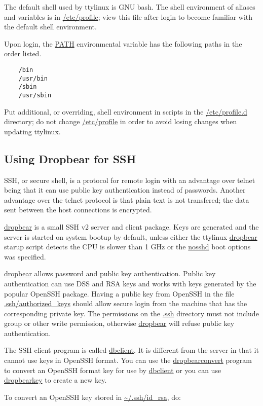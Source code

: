 \documentclass[10pt]{article}
\begin{document}
The default shell used by ttylinux is GNU bash. The shell environment of
aliases and variables is in \url{/etc/profile}; view this file after login to
become familiar with the default shell environment.

Upon login, the \url{PATH} environmental variable has the following paths in
the order listed.

\begin{lstlisting}
	/bin
	/usr/bin
	/sbin
	/usr/sbin
\end{lstlisting}

Put additional, or overriding, shell environment in scripts in the
\url{/etc/profile.d} directory; do not change \url{/etc/profile} in order to
avoid losing changes when updating ttylinux.

\subsection{Using Dropbear for SSH}

SSH, or secure shell, is a protocol for remote login with an advantage over
telnet being that it can use public key authentication instead of passwords.
Another advantage over the telnet protocol is that plain text is not
transfered; the data sent between the host connections is encrypted.

\url{dropbear} is a small SSH v2 server and client package. Keys are generated
and the server is started on system bootup by default, unless either the
ttylinux \url{dropbear} starup script detects the CPU is slower than 1 GHz or
the \url{nosshd} boot options was specified.

\url{dropbear} allows password and public key authentication. Public key
authentication can use DSS and RSA keys and works with keys generated by the
popular OpenSSH package. Having a public key from OpenSSH in the file
\url{.ssh/authorized_keys} should allow secure login from the machine that has
the corresponding private key. The permissions on the \url{.ssh} directory must
not include group or other write permission, otherwise \url{dropbear} will
refuse public key authentication.

The SSH client program is called \url{dbclient}. It is different from the
server in that it cannot use keys in OpenSSH format. You can use the
\url{dropbearconvert} program to convert an OpenSSH format key for use by
\url{dbclient} or you can use \url{dropbearkey} to create a new key.

To convert an OpenSSH key stored in \url{~/.ssh/id_rsa}, do:
\end{document}
